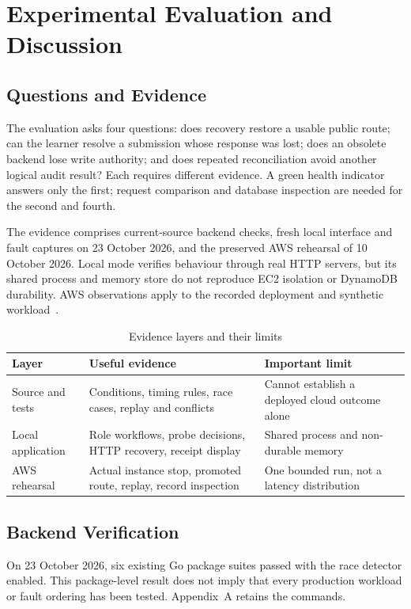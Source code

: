 \chapter{Experimental Evaluation and Discussion}
\section{Questions and Evidence}
The evaluation asks four questions: does recovery restore a usable public route; can the learner resolve a submission whose response was lost; does an obsolete backend lose write authority; and does repeated reconciliation avoid another logical audit result? Each requires different evidence. A green health indicator answers only the first; request comparison and database inspection are needed for the second and fourth.

The evidence comprises current-source backend checks, fresh local interface and fault captures on 23 October 2026, and the preserved AWS rehearsal of 10 October 2026. Local mode verifies behaviour through real HTTP servers, but its shared process and memory store do not reproduce EC2 isolation or DynamoDB durability. AWS observations apply to the recorded deployment and synthetic workload~\cite{project-source,local-capture,cloud-run,cloud-records}.

\begin{table}[H]\centering\small
\caption{Evidence layers and their limits}\label{tab:evidence-layers}
\begin{tabularx}{\textwidth}{@{}L{30mm}YY@{}}\toprule
\textbf{Layer} & \textbf{Useful evidence} & \textbf{Important limit}\\\midrule
Source and tests & Conditions, timing rules, race cases, replay and conflicts & Cannot establish a deployed cloud outcome alone\\
Local application & Role workflows, probe decisions, HTTP recovery, receipt display & Shared process and non-durable memory\\
AWS rehearsal & Actual instance stop, promoted route, replay, record inspection & One bounded run, not a latency distribution\\\bottomrule
\end{tabularx}\end{table}

\section{Backend Verification}
On 23 October 2026, six existing Go package suites passed with the race detector enabled. This package-level result does not imply that every production workload or fault ordering has been tested. Appendix~A retains the commands.

